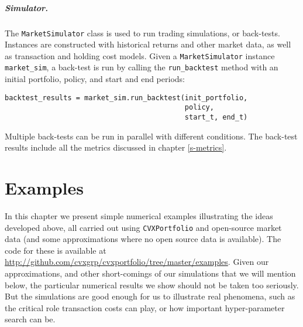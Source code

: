 \documentclass[openany]{article}  %
\begin{document}
\paragraph{Simulator.} The \verb|MarketSimulator| class is used to run trading
simulations, or back-tests.
Instances are constructed with historical returns and other market data, as well
as transaction and holding cost models.
Given a \verb|MarketSimulator| instance \verb|market_sim|, a back-test is run by calling the
\verb|run_backtest| method with an initial portfolio, policy, and start and end
periods:
\begin{verbatim}
backtest_results = market_sim.run_backtest(init_portfolio,
                                           policy,
                                           start_t, end_t)
\end{verbatim}
Multiple back-tests can be run in parallel with different conditions.
The back-test results include all the metrics discussed in chapter \ref{s-metrics}.

\chapter{Examples}\label{s-examples}
In this chapter we present
simple numerical examples illustrating the ideas developed
above, all carried out using \verb|CVXPortfolio| and
open-source market data (and some approximations where no open
source data is available).
The code for these is available at
\mbox{\url{http://github.com/cvxgrp/cvxportfolio/tree/master/examples}.}
Given our approximations, and other short-comings of our simulations
that we will mention below,
the particular numerical results we show should not be taken
too seriously.  But the simulations are good enough for us to illustrate
real phenomena, such as the critical role transaction costs
can play, or how important hyper-parameter search can be.
\end{document}
